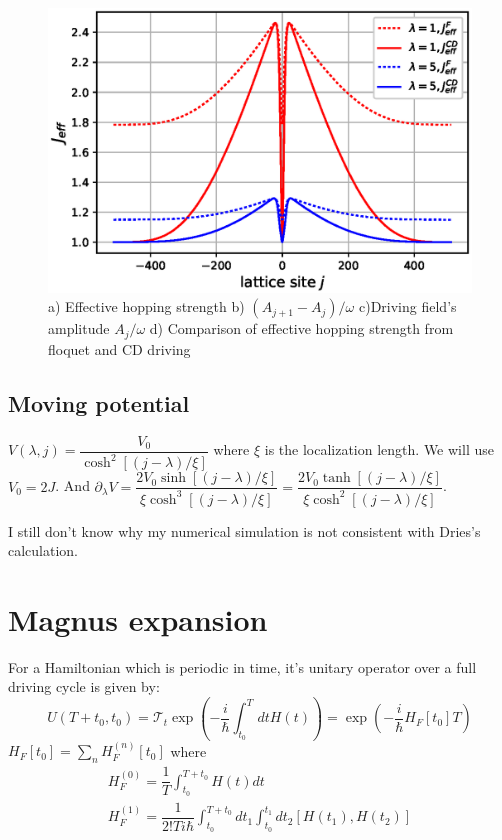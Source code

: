 \documentclass[11pt,a4paper]{article}
\begin{document}
\begin{figure}[!ht]
\begin{center}
\includegraphics[scale=0.5]{pics/j_eff_comp_eckart_potn.eps}
\caption{ a) Effective hopping strength b) $(A_{j+1}-A_{j})/\omega$ c)Driving field's amplitude $A_{j}/\omega$ d) Comparison of effective hopping strength from floquet and CD driving }
\end{center}
\end{figure}

\subsection{Moving potential}
$V(\lambda,j) =\dfrac{V_0}{\cosh^2 [(j-\lambda)/ \xi]}$ where $\xi$ is the localization length.
We will use $V_0=2J$. And  $\partial_{\lambda}V=\dfrac{2V_0 \sinh [(j-\lambda)/ \xi]}{ \xi \cosh^3 [(j-\lambda)/ \xi]}=\dfrac{2V_0 \tanh [(j-\lambda)/ \xi]}{ \xi \cosh^2 [(j-\lambda)/ \xi]} $.

I still don't know why my numerical simulation is not consistent with Dries's calculation.

\appendix 
\section{Magnus expansion}
For a Hamiltonian which is periodic in time, it's unitary operator over a full driving cycle is given by:
\begin{equation}
U(T+ t_0, t_0)= \mathcal{T}_t\exp(- \dfrac{i}{\hbar} \int_{t_0}^T dt H(t))= \exp(- \dfrac{i}{\hbar}  H_F[t_0]T)
\end{equation}
$ H_F[t_0]= \sum_n H_F^{(n)}[t_0] $ 
where 
\begin{align*}
H_F^{(0)}= \dfrac{1}{T} \int_{t_0}^{T+t_0} H(t) dt \\
H_F^{(1)}= \dfrac{1}{2! T i \hbar} \int_{t_0}^{T+t_0}  dt_1\int_{t_0}^{t_1} dt_2  [H(t_1), H(t_2)] 
\end{align*}
\end{document}
